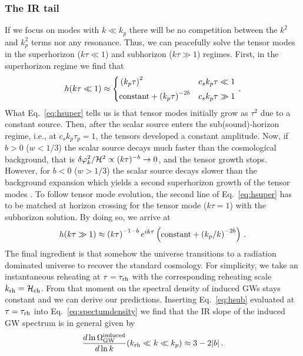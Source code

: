 \documentclass[a4paper,11pt]{article}
\numberwithin{equation}{section}
\begin{document}
\subsubsection{The IR tail}
If we focus on modes with $k\ll k_p$ there will be no competition between the $k^2$ and $k_p^2$ terms nor any resonance. Thus, we can peacefully solve the tensor modes in the superhorizon ($k\tau\ll1$) and subhorizon ($k\tau\gg1$) regimes. First, in the superhorizon regime we find that
\begin{equation}\label{eq:hsuper}
h(k\tau\ll1)\approx\left\{
\begin{aligned}
&\left(k_p\tau\right)^2 & c_sk_p\tau\ll 1 \\
&{\rm constant}+\left(k_p\tau\right)^{-2b}& c_sk_p\tau\gg 1 
\end{aligned}
\right.\,.
\end{equation}
What Eq.~\eqref{eq:hsuper} tells us is that tensor modes initially grow as $\tau^2$ due to a constant source. Then, after the scalar source enters the sub(sound)-horizon regime, i.e., at $c_sk_p\tau_p=1$, the tensors developed a constant amplitude. Now, if $b>0$ ($w<1/3$) the scalar source decays much faster than the cosmological background, that is $\delta\varphi_k^2/{\cal H}^2\propto (k\tau)^{-b}\to 0$, and the tensor growth stops. However, for $b<0$ ($w>1/3$) the scalar source decays slower than the background expansion which yields a second superhorizon growth of the tensor modes \cite{Domenech:2020kqm}. To follow tensor mode evolution, the second line of Eq.~\eqref{eq:hsuper} has to be matched at horizon crossing for the tensor mode ($k\tau=1$) with the subhorizon solution. By doing so, we arrive at
\begin{equation}\label{eq:hsub}
h(k\tau\gg 1)\approx\left(k\tau\right)^{-1-b}{e^{ik\tau}}\left({\rm constant}+\left({k_p}/{k}\right)^{-2b}\right)\,.
\end{equation}
The final ingredient is that somehow the universe transitions to a radiation dominated universe to recover the standard cosmology. For simplicity, we take an instantaneous reheating at $\tau=\tau_{\rm rh}$ with the corresponding reheating scale $k_{\rm rh}={\cal H}_{\rm rh}$. From that moment on the spectral density of induced GWs stays constant and we can derive our predictions. Inserting Eq.~\eqref{eq:hsub} evaluated at $\tau=\tau_{\rm rh}$ into Eq.~\eqref{eq:spectumdensity} we find that the IR slope of the induced GW spectrum is in general given by
\begin{equation}\label{eq:IRtail}
\frac{d\ln\Omega_{\rm GW}^{\rm induced}}{d\ln k}(k_{\rm rh}\ll k\ll k_p)\approx 3-2|b|\,.
\end{equation}
\end{document}
